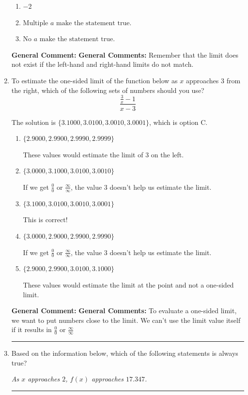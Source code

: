 \documentclass{extbook}[14pt]
\newcommand{\litem}[1]{\item #1

\rule{\textwidth}{0.4pt}}
\begin{document}
\begin{enumerate}
{\begin{enumerate}[label=\Alph*.]
\item \( -2 \)


\item \( \text{Multiple } a \text{ make the statement true}. \)


\item \( \text{No } a \text{ make the statement true}. \)


\end{enumerate}

\textbf{General Comment:} \textbf{General Comments:} Remember that the limit does not exist if the left-hand and right-hand limits do not match.
}
\litem{
To estimate the one-sided limit of the function below as $x$ approaches 3 from the right, which of the following sets of numbers should you use?
\[ \frac{\frac{3}{x} - 1}{x - 3} \]

The solution is \( \{ 3.1000, 3.0100, 3.0010, 3.0001 \} \), which is option C.\begin{enumerate}[label=\Alph*.]
\item \( \{ 2.9000, 2.9900, 2.9990, 2.9999 \} \)

These values would estimate the limit of 3 on the left.
\item \( \{ 3.0000, 3.1000, 3.0100, 3.0010 \} \)

If we get $\frac{0}{0}$ or $\frac{\infty}{\infty}$, the value 3 doesn't help us estimate the limit.
\item \( \{ 3.1000, 3.0100, 3.0010, 3.0001 \} \)

This is correct!
\item \( \{ 3.0000, 2.9000, 2.9900, 2.9990 \} \)

If we get $\frac{0}{0}$ or $\frac{\infty}{\infty}$, the value 3 doesn't help us estimate the limit.
\item \( \{ 2.9000, 2.9900, 3.0100, 3.1000 \} \)

These values would estimate the limit at the point and not a one-sided limit.
\end{enumerate}

\textbf{General Comment:} \textbf{General Comments:} To evaluate a one-sided limit, we want to put numbers close to the limit. We can't use the limit value itself if it results in $\frac{0}{0}$ or $\frac{\infty}{\infty}$
}
\litem{
Based on the information below, which of the following statements is always true?

\begin{center}
    \textit{ As $x$ approaches $2$, $f(x)$ approaches $17.347$. }
\end{center}


}
\end{enumerate}
\end{document}
